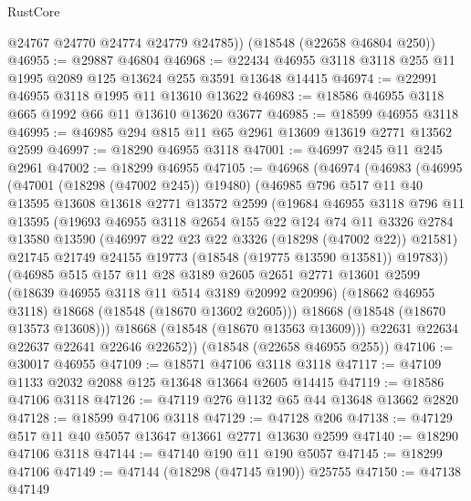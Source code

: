 \begin{lexlean}{RustCore}
\begin{coremodule}
        @24767
        @24770
        @24774
        @24779
        @24785))
    (@18548 (@22658 @46804 @250))
@46955 := @29887 @46804
@46968 := @22434 @46955 @3118 @3118 @255 @11 @1995 @2089 @125 @13624 @255 @3591 @13648 @14415
@46974 := @22991 @46955 @3118 @1995 @11 @13610 @13622
@46983 := @18586 @46955 @3118 @665 @1992 @66 @11 @13610 @13620 @3677
@46985 := @18599 @46955 @3118
@46995 := @46985 @294 @815 @11 @65 @2961 @13609 @13619 @2771 @13562 @2599
@46997 := @18290 @46955 @3118
@47001 := @46997 @245 @11 @245 @2961
@47002 := @18299 @46955
@47105 := @46968
    (@46974
      (@46983
        (@46995
          (@47001 (@18298 (@47002 @245)) @19480)
          (@46985
            @796
            @517
            @11
            @40
            @13595
            @13608
            @13618
            @2771
            @13572
            @2599
            (@19684
              @46955
              @3118
              @796
              @11
              @13595
              (@19693
                @46955
                @3118
                @2654
                @155
                @22
                @124
                @74
                @11
                @3326
                @2784
                @13580
                @13590
                (@46997 @22 @23 @22 @3326 (@18298 (@47002 @22)) @21581)
                @21745
                @21749
                @24155
                @19773
                (@18548 (@19775 @13590 @13581))
                @19783))
            (@46985
              @515
              @157
              @11
              @28
              @3189
              @2605
              @2651
              @2771
              @13601
              @2599
              (@18639 @46955 @3118 @11 @514 @3189 @20992 @20996)
              (@18662 @46955 @3118)
              @18668
              (@18548 (@18670 @13602 @2605)))
            @18668
            (@18548 (@18670 @13573 @13608)))
          @18668
          (@18548 (@18670 @13563 @13609)))
        @22631
        @22634
        @22637
        @22641
        @22646
        @22652))
    (@18548 (@22658 @46955 @255))
@47106 := @30017 @46955
@47109 := @18571 @47106 @3118 @3118
@47117 := @47109 @1133 @2032 @2088 @125 @13648 @13664 @2605 @14415
@47119 := @18586 @47106 @3118
@47126 := @47119 @276 @1132 @65 @44 @13648 @13662 @2820
@47128 := @18599 @47106 @3118
@47129 := @47128 @206
@47138 := @47129 @517 @11 @40 @5057 @13647 @13661 @2771 @13630 @2599
@47140 := @18290 @47106 @3118
@47144 := @47140 @190 @11 @190 @5057
@47145 := @18299 @47106
@47149 := @47144 (@18298 (@47145 @190)) @25755
@47150 := @47138 @47149

\end{coremodule}
\end{lexlean}
